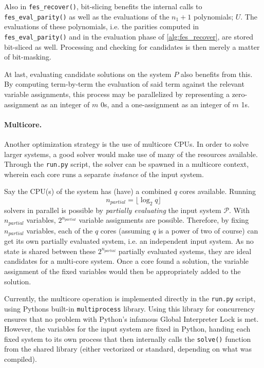 Also in \texttt{fes\_recover()}, bit-slicing benefits the internal calls to \texttt{fes\_eval\_parity()} as well as the evaluations of the $n_1 + 1$ polynomials; $U$. The evaluations of these polynomials, i.e. the parities computed in \texttt{fes\_eval\_parity()} and in the evaluation phase of \cref{alg:fes_recover}, are stored bit-sliced as well. Processing and checking for candidates is then merely a matter of bit-masking. 

At last, evaluating candidate solutions on the system $P$ also benefits from this. By computing term-by-term the evaluation of said term against the relevant variable assignments, this process may be parallelized by representing a zero-assignment as an integer of $m$ 0s, and a one-assignment as an integer of $m$ 1s.

\paragraph{Multicore.} Another optimization strategy is the use of multicore CPUs. In order to solve larger systems, a good solver would make use of many of the resources available. Through the \texttt{run.py} script, the solver can be spawned in a multicore context, wherein each core runs a separate \textit{instance} of the input system.

Say the CPU(s) of the system has (have) a combined $q$ cores available. Running 
$$
    n_{partial} = \lfloor \log_2 q \rfloor
$$ 
solvers in parallel is possible by \textit{partially evaluating} the input system $\mathcal{P}$. With $n_{partial}$ variables, $2^{n_{partial}}$ variable assignments are possible. Therefore, by fixing $n_{partial}$ variables, each of the $q$ cores (assuming $q$ is a power of two of course) can get its own partially evaluated system, i.e. an independent input system. As no state is shared between these $2^{n_{partial}}$ partially evaluated systems, they are ideal candidates for a multi-core system. Once a core found a solution, the variable assignment of the fixed variables would then be appropriately added to the solution.

Currently, the multicore operation is implemented directly in the \texttt{run.py} script, using Pythons built-in \texttt{multiprocess} library. Using this library for concurrency ensures that no problem with Python's infamous Global Interpreter Lock is met. However, the variables for the input system are fixed in Python, handing each fixed system to its own process that then internally calls the \texttt{solve()} function from the shared library (either vectorized or standard, depending on what was compiled).

